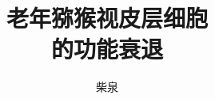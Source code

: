 \documentclass[master,pagecenter]{ustcthesis}
\title{老年猕猴视皮层细胞 \texorpdfstring{\\ 的功能衰退}{}}
\author{柴泉}
\begin{document}
\maketitle

%
%
%

\frontmatter{}

\tableofcontents
\listoffigures
\listoftables
% 

\mainmatter








\appendix


\backmatter


% 
\end{document}
